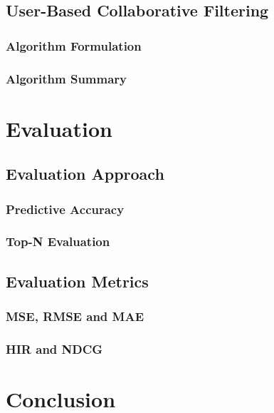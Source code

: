\subsection{User-Based Collaborative Filtering}
\label{subsec:User-Based Collaborative Filtering}

\subsubsection{Algorithm Formulation}
\label{subsubsec:Algorithm Formulation}

\subsubsection{Algorithm Summary}
\label{subsubsec:Algorithm Summary}

\section{Evaluation}
\label{sec:Evaluation}

\subsection{Evaluation Approach}
\label{subsec:Evaluation Approach}

\subsubsection{Predictive Accuracy}
\label{subsubsec:Predictive Accuracy}

\subsubsection{Top-N Evaluation}
\label{subsubsec:Top-N Evaluation}

\subsection{Evaluation Metrics}
\label{subsec:Evaluation Metrics}

\subsubsection{MSE, RMSE and MAE}
\label{subsubsec:MSE, RMSE and MAE}

\subsubsection{HIR and NDCG}
\label{subsubsec:HIR and NDCG}

\section{Conclusion}
\label{sec:Conclusion}



